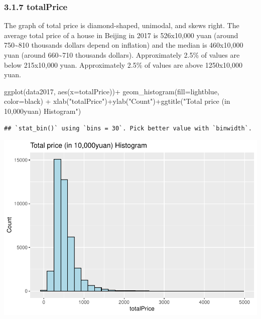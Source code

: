 \documentclass[
]{article}
\newenvironment{Shaded}{\begin{snugshade}}{\end{snugshade}}
\newcommand{\AttributeTok}[1]{\textcolor[rgb]{0.77,0.63,0.00}{#1}}
\newcommand{\FunctionTok}[1]{\textcolor[rgb]{0.00,0.00,0.00}{#1}}
\newcommand{\NormalTok}[1]{#1}
\newcommand{\SpecialCharTok}[1]{\textcolor[rgb]{0.00,0.00,0.00}{#1}}
\newcommand{\StringTok}[1]{\textcolor[rgb]{0.31,0.60,0.02}{#1}}
\begin{document}
\hypertarget{totalprice}{%
\subsubsection{3.1.7 totalPrice}\label{totalprice}}

The graph of total price is diamond-shaped, unimodal, and skews right.
The average total price of a house in Beijing in 2017 is 526x10,000 yuan
(around 750\textasciitilde810 thousands dollars depend on inflation) and
the median is 460x10,000 yuan (around 660\textasciitilde710 thousands
dollars). Approximately 2.5\% of values are below 215x10,000 yuan.
Approximately 2.5\% of values are above 1250x10,000 yuan.

\begin{Shaded}
\begin{Highlighting}[]
\FunctionTok{ggplot}\NormalTok{(data2017, }\FunctionTok{aes}\NormalTok{(}\AttributeTok{x=}\NormalTok{totalPrice))}\SpecialCharTok{+}
  \FunctionTok{geom\_histogram}\NormalTok{(}\AttributeTok{fill=}\StringTok{\textquotesingle{}lightblue\textquotesingle{}}\NormalTok{, }\AttributeTok{color=}\StringTok{\textquotesingle{}black\textquotesingle{}}\NormalTok{) }\SpecialCharTok{+}
  \FunctionTok{xlab}\NormalTok{(}\StringTok{"totalPrice"}\NormalTok{)}\SpecialCharTok{+}\FunctionTok{ylab}\NormalTok{(}\StringTok{"Count"}\NormalTok{)}\SpecialCharTok{+}\FunctionTok{ggtitle}\NormalTok{(}\StringTok{"Total price (in 10,000yuan) Histogram"}\NormalTok{)}
\end{Highlighting}
\end{Shaded}

\begin{verbatim}
## `stat_bin()` using `bins = 30`. Pick better value with `binwidth`.
\end{verbatim}

\includegraphics{Project_files/figure-latex/unnamed-chunk-15-1.pdf}
\end{document}
